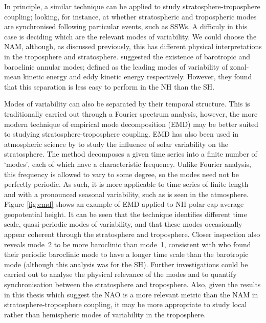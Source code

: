 In principle, a similar technique can be applied to study
stratosphere-troposphere coupling; looking, for instance, at whether
stratospheric and tropospheric modes are synchronised following particular
events, such as SSWs. A difficuly in this case is deciding which are the
relevant modes of variability. We could choose the NAM, although, as discussed
previously, this has different physical interpretations in the troposphere and
stratosphere. \citet{Thompson2014} suggested the existence of barotropic and
baroclinic annular modes; defined as the leading modes of variability of
zonal-mean kinetic energy and eddy kinetic energy respectively. However, they
found that this separation is less easy to perform in the NH than the SH.

Modes of variability can also be separated by their temporal structure. This is
traditionally carried out through a Fourier spectrum analysis, however, the more
modern technique of empirical mode decomposition (EMD) \citep{Huang1998} may be
better suited to studying stratosphere-troposphere coupling. EMD has also been
used in atmospheric science by \citet{Coughlin2004} to study the influence of
solar variability on the stratosphere. The method decomposes a given time series
into a finite number of `modes', each of which have a characteristic
frequency. Unlike Fourier analysis, this frequency is allowed to vary to some
degree, so the modes need not be perfectly periodic. As such, it is more
applicable to time series of finite length and with a pronounced seasonal
variability, such as is seen in the atmosphere. Figure \ref{fig:emd} shows an
example of EMD applied to NH polar-cap average geopotential height. It can be
seen that the technique identifies different time scale, quasi-periodic modes of
variability, and that these modes occasionally appear coherent through the
stratosphere and troposphere. Closer inspection also reveals mode~2 to be more
baroclinic than mode~1, consistent with \citet{Thompson2014} who found their
periodic baroclinic mode to have a longer time scale than the barotropic mode
(although this analysis was for the SH). Further investigations could be carried
out to analyse the physical relevance of the modes and to quantify
synchronisation between the stratosphere and troposphere. Also, given the
results in this thesis which suggest the NAO is a more relevant metric than the
NAM in stratosphere-troposphere coupling, it may be more appropriate to study
local rather than hemispheric modes of variability in the troposphere.

